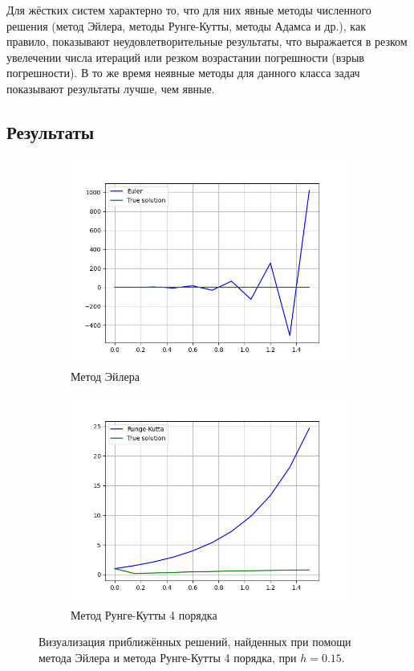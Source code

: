 \documentclass[12pt]{article}%
\begin{document}
Для жёстких систем характерно то, что для них явные методы численного решения (метод Эйлера, методы Рунге-Кутты, методы Адамса и др.), как правило, показывают неудовлетворительные результаты, что выражается в резком увелечении числа итераций или резком возрастании погрешности (взрыв погрешности). В то же время неявные методы для данного класса задач показывают результаты лучше, чем явные.



\subsection{Результаты}
\begin{figure}[!h]
\centering
\begin{subfigure}{0.49\textwidth}
    \includegraphics[width=\textwidth]{task3_euler.png}
    \caption{Метод Эйлера}
\end{subfigure}
\hfill
\begin{subfigure}{0.49\textwidth}
    \includegraphics[width=\textwidth]{task3_rk.png}
    \caption{Метод Рунге-Кутты 4 порядка}
\end{subfigure}

\caption{Визуализация приближённых решений, найденных при помощи метода Эйлера и метода Рунге-Кутты 4 порядка, при $h = 0.15$.}
\end{figure}
\end{document}
